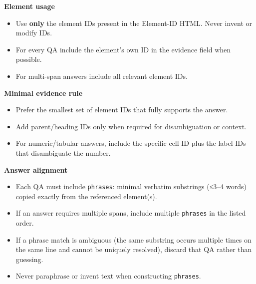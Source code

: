 \begin{tcolorbox}[myprompt, title=Evidence Rules \& Answer Alignment]

\medskip
\noindent\textbf{Element usage}
\begin{itemize}
  \item Use \textbf{only} the element IDs present in the Element-ID HTML. Never invent or modify IDs.
  \item For every QA include the element’s own ID in the evidence field when possible.
  \item For multi-span answers include all relevant element IDs.
\end{itemize}

\medskip
\noindent\textbf{Minimal evidence rule}
\begin{itemize}
  \item Prefer the smallest set of element IDs that fully supports the answer.
  \item Add parent/heading IDs only when required for disambiguation or context.
  \item For numeric/tabular answers, include the specific cell ID plus the label IDs that disambiguate the number.
\end{itemize}

\medskip
\noindent\textbf{Answer alignment}
\begin{itemize}
  \item Each QA must include \texttt{phrases}: minimal verbatim substrings (≤3–4 words) copied exactly from the referenced element(s).
  \item If an answer requires multiple spans, include multiple \texttt{phrases} in the listed order.
  \item If a phrase match is ambiguous (the same substring occurs multiple times on the same line and cannot be uniquely resolved), discard that QA rather than guessing.
  \item Never paraphrase or invent text when constructing \texttt{phrases}.
\end{itemize}
\end{tcolorbox}






